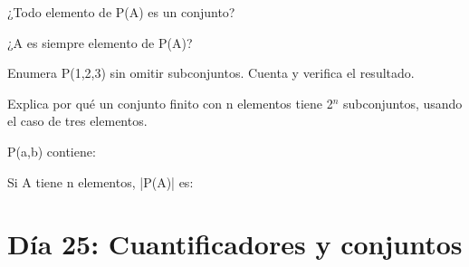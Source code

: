 \begin{activity}[id=dia-24-corta-05,type=short,weight=1]

¿Todo elemento de P(A) es un conjunto?

\end{activity}

\begin{activity}[id=dia-24-corta-06,type=short,weight=1]

¿A es siempre elemento de P(A)?

\end{activity}

\begin{activity}[id=dia-24-desarrollo-01,type=long,weight=2]

Enumera P({1,2,3}) sin omitir subconjuntos. Cuenta y verifica el resultado.

\end{activity}

\begin{activity}[id=dia-24-desarrollo-02,type=long,weight=2]

Explica por qué un conjunto finito con n elementos tiene 2\(^{n}\) subconjuntos, usando el caso de tres elementos.

\end{activity}

\begin{activity}[id=dia-24-opcion-01,type=choice,weight=1]

P({a,b}) contiene:





\end{activity}

\begin{activity}[id=dia-24-opcion-02,type=choice,weight=1]

Si A tiene n elementos, |P(A)| es:





\end{activity}

\section{Día 25: Cuantificadores y conjuntos}

